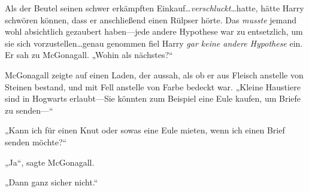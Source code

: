 Als der Beutel seinen schwer erkämpften Einkauf…\emph{verschluckt}…hatte, hätte Harry schwören können, dass er anschließend einen Rülpser hörte. Das \emph{musste} jemand wohl absichtlich gezaubert haben—jede andere Hypothese war zu entsetzlich, um sie sich vorzustellen…genau genommen fiel Harry \emph{gar keine andere Hypothese} ein. Er sah zu McGonagall. „Wohin als nächstes?“

McGonagall zeigte auf einen Laden, der aussah, als ob er aus Fleisch anstelle von Steinen bestand, und mit Fell anstelle von Farbe bedeckt war. „Kleine Haustiere sind in Hogwarts erlaubt—Sie könnten zum Beispiel eine Eule kaufen, um Briefe zu senden—“

„Kann ich für einen Knut oder sowas eine Eule mieten, wenn ich einen Brief senden möchte?“

„Ja“, sagte McGonagall.

„Dann ganz sicher nicht.“

